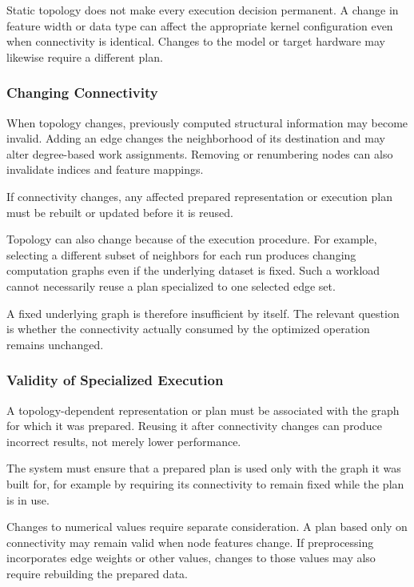Static topology does not make every execution decision permanent. A change in feature width or data type can affect the appropriate kernel configuration even when connectivity is identical. Changes to the model or target hardware may likewise require a different plan.

\subsubsection{Changing Connectivity}

When topology changes, previously computed structural information may become invalid. Adding an edge changes the neighborhood of its destination and may alter degree-based work assignments. Removing or renumbering nodes can also invalidate indices and feature mappings.

If connectivity changes, any affected prepared representation or execution plan must be rebuilt or updated before it is reused.

Topology can also change because of the execution procedure. For example, selecting a different subset of neighbors for each run produces changing computation graphs even if the underlying dataset is fixed. Such a workload cannot necessarily reuse a plan specialized to one selected edge set.

A fixed underlying graph is therefore insufficient by itself. The relevant question is whether the connectivity actually consumed by the optimized operation remains unchanged.

\subsubsection{Validity of Specialized Execution}

A topology-dependent representation or plan must be associated with the graph for which it was prepared. Reusing it after connectivity changes can produce incorrect results, not merely lower performance.

The system must ensure that a prepared plan is used only with the graph it was built for, for example by requiring its connectivity to remain fixed while the plan is in use.

Changes to numerical values require separate consideration. A plan based only on connectivity may remain valid when node features change. If preprocessing incorporates edge weights or other values, changes to those values may also require rebuilding the prepared data.
